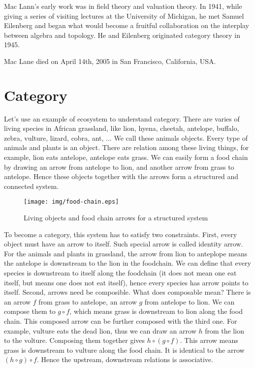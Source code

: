 \documentclass{article}
\begin{document}
Mac Lann's early work was in field theory and valuation theory. In 1941, while giving a series of visiting lectures at the University of Michigan, he met Samuel Eilenberg and began what would become a fruitful collaboration on the interplay between algebra and topology. He and Eilenberg originated category theory in 1945.

Mac Lane died on April 14th, 2005 in San Francisco, California, USA.

\section{Category}

Let's use an example of ecosystem to understand category. There are varies of living species in African grassland, like lion, hyena, cheetah, antelope, buffalo, zebra, vulture, lizard, cobra, ant, ... We call these animals objects. Every type of animals and plants is an object. There are relation among these living things, for example, lion eats antelope, antelope eats grass. We can easily form a food chain by drawing an arrow from antelope to lion, and another arrow from grass to antelope. Hence these objects together with the arrows form a structured and connected system.

\begin{figure}[htbp]
 \centering
 \texttt{[image: img/food-chain.eps]}
 \caption{Living objects and food chain arrows for a structured system}
 \label{fig:powerset}
\end{figure}

To become a category, this system has to satisfy two constraints. First, every object must have an arrow to itself. Such special arrow is called identity arrow. For the animals and plants in grassland, the arrow from lion to anteplope means the antelope is downstream to the lion in the foodchain. We can define that every species is downstream to itself along the foodchain (it does not mean one eat itself, but means one does not eat itself), hence every species has arrow points to itself. Second, arrows need be composible. What does composable mean? There is an arrow $f$ from grass to antelope, an arrow $g$ from antelope to lion. We can compose them to $g \circ f$, which means grass is downstream to lion along the food chain. This composed arrow can be further composed with the third one. For example, vulture eats the dead lion, thus we can draw an arrow $h$ from the lion to the volture. Composing them together gives $h \circ (g \circ f)$. This arrow means grass is downstream to vulture along the food chain. It is identical to the arrow $(h \circ g) \circ f$. Hence the upstream, downstream relations is associative.
\end{document}
